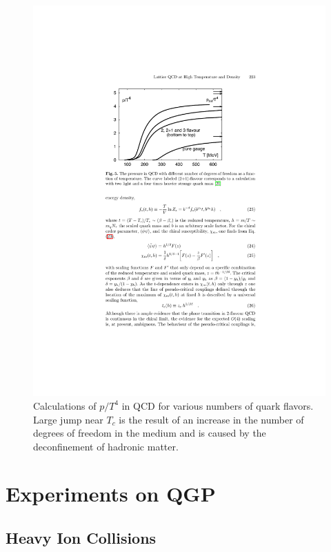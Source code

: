 \begin{figure}[htbp]
\begin{center}
\includegraphics[scale=1.0]{Plots/Intro/pressure.pdf}
\end{center}
\caption[$p/T^4$ Calculations]{Calculations of $p/T^4$ in QCD for various numbers of quark flavors. Large jump near $T_c$ is the result of an increase in the number of degrees of freedom in the medium and is caused by the deconfinement of hadronic matter.}
\label{fig:pressure}
\end{figure}

\section{Experiments on QGP}

\subsection{Heavy Ion Collisions}

